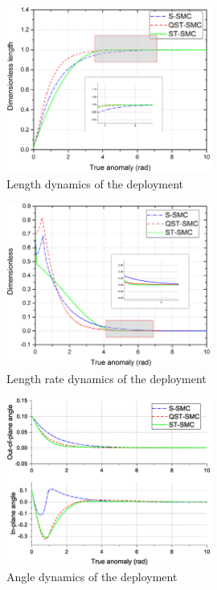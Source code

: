 \documentclass[3p]{elsarticle}
\theoremstyle{plain}
\theoremstyle{remark}
\begin{document}
\begin{figure}
\centering
\includegraphics[width=0.6\textwidth]{paper4_fig3.eps}
\caption{Length dynamics of the deployment}
\label{fig:3}
\end{figure}
\begin{figure}
\centering
\includegraphics[width=0.6\textwidth]{paper4_fig4.eps}
\caption{Length rate dynamics of the deployment}
\label{fig:4}
\end{figure}
\begin{figure}
\centering
\includegraphics[width=0.6\textwidth]{paper4_fig5.eps}
\caption{Angle dynamics of the deployment}
\label{fig:5}
\end{figure}
\end{document}
